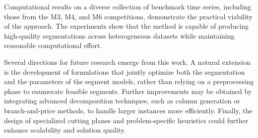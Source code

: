 \documentclass[preprints,article,submit,pdftex,moreauthors]{Definitions/mdpi}
\begin{document}
Computational results on a diverse collection of benchmark time series, including those from the M3, M4, and M6 competitions, demonstrate the practical viability of the approach. The experiments show that the method is capable of producing high-quality segmentations across heterogeneous datasets while maintaining reasonable computational effort.

Several directions for future research emerge from this work. A natural extension is the development of formulations that jointly optimize both the segmentation and the parameters of the segment models, rather than relying on a preprocessing phase to enumerate feasible segments. Further improvements may be obtained by integrating advanced decomposition techniques, such as column generation or branch-and-price methods, to handle larger instances more efficiently. Finally, the design of specialized cutting planes and problem-specific heuristics could further enhance scalability and solution quality.

\vspace{6pt}










\end{document}
